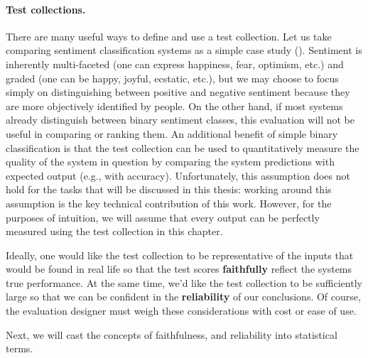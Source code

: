 \paragraph{Test collections.}
There are many useful ways to define and use a test collection.
Let us take comparing sentiment classification systems as a simple case study ().
Sentiment is inherently multi-faceted (one can express happiness, fear, optimism, etc.) and graded (one can be happy, joyful, ecstatic, etc.), but we may choose to focus simply on distinguishing between positive and negative sentiment because they are more objectively identified by people.
On the other hand, if most systems already distinguish between binary sentiment classes, this evaluation will not be useful in comparing or ranking them.
An additional benefit of simple binary classification is that the test collection can be used to quantitatively measure the quality of the system in question by comparing the system predictions with expected output (e.g., with accuracy).
Unfortunately, this assumption does not hold for the tasks that will be discussed in this thesis: working around this assumption is the key technical contribution of this work. 
However, for the purposes of intuition, we will assume that every output can be perfectly measured using the test collection in this chapter.

Ideally, one would like the test collection to be representative of the inputs that would be found in real life so that the test scores \textbf{faithfully} reflect the systems true performance.
At the same time, we'd like the test collection to be sufficiently large so that we can be confident in the \textbf{reliability} of our conclusions.
Of course, the evaluation designer must weigh these considerations with cost or ease of use.

Next, we will cast the concepts of faithfulness, and reliability into statistical terms.

